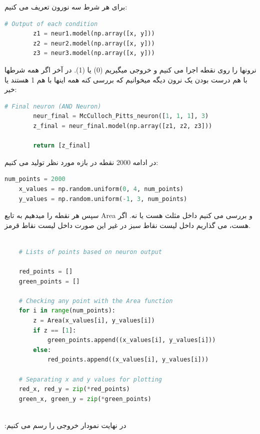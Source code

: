 \documentclass{article}
\begin{document}
برای هر شرط سه نورون تعریف می کنیم:

\begin{lstlisting}[language=Python]
        # Output of each condition
        z1 = neur1.model(np.array([x, y]))
        z2 = neur2.model(np.array([x, y]))
        z3 = neur3.model(np.array([x, y]))
\end{lstlisting}

نرونها را روی نقطه اجرا می کنیم و خروجی میگیریم (0) یا (1). در آخر اگر همه شرطها با هم درست بودن یک نرون دیگه میخوانیم که بررسی کنه همه اینها با هم 1 هستند یا خیر:

\begin{lstlisting}[language=Python]
        # Final neuron (AND Neuron)
        neur_final = McCulloch_Pitts_neuron([1, 1, 1], 3)
        z_final = neur_final.model(np.array([z1, z2, z3]))
    
        return [z_final]
\end{lstlisting}

در ادامه 2000 نقطه در بازه مورد نظر تولید می کنیم:


\begin{lstlisting}[language=Python]
    num_points = 2000
    x_values = np.random.uniform(0, 4, num_points)
    y_values = np.random.uniform(-1, 3, num_points)
\end{lstlisting}

سپس هر نقطه را میدهیم به تابع Area و بررسی می کنیم داخل مثلث هست یا نه. اگر هست، می گذاریم داخل لیست نقاط سبز در غیر این صورت داخل لیست نقاط قرمز. 


\begin{lstlisting}[language=Python]

    # Lists of points based on neuron output
    
    red_points = []
    green_points = []
    
    # Checking any point with the Area function
    for i in range(num_points):
        z = Area(x_values[i], y_values[i])
        if z == [1]:
            green_points.append((x_values[i], y_values[i]))
        else:
            red_points.append((x_values[i], y_values[i]))
    
    # Separating x and y values ​​for plotting
    red_x, red_y = zip(*red_points)
    green_x, green_y = zip(*green_points)
    
\end{lstlisting}

:در نهایت نمودار خروجی را رسم می کنیم
\end{document}
